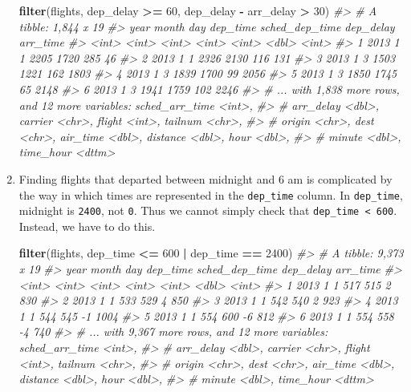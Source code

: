 \documentclass[]{book}
\newenvironment{Shaded}{\begin{snugshade}}{\end{snugshade}}
\newcommand{\CommentTok}[1]{\textcolor[rgb]{0.56,0.35,0.01}{\textit{#1}}}
\newcommand{\DecValTok}[1]{\textcolor[rgb]{0.00,0.00,0.81}{#1}}
\newcommand{\KeywordTok}[1]{\textcolor[rgb]{0.13,0.29,0.53}{\textbf{#1}}}
\newcommand{\NormalTok}[1]{#1}
\newcommand{\OperatorTok}[1]{\textcolor[rgb]{0.81,0.36,0.00}{\textbf{#1}}}
\newcommand{\StringTok}[1]{\textcolor[rgb]{0.31,0.60,0.02}{#1}}
\theoremstyle{plain}
\theoremstyle{remark}
\begin{document}
\begin{enumerate}
\begin{Shaded}
\begin{Highlighting}[]
\KeywordTok{filter}\NormalTok{(flights, dep_delay }\OperatorTok{>=}\StringTok{ }\DecValTok{60}\NormalTok{, dep_delay }\OperatorTok{-}\StringTok{ }\NormalTok{arr_delay }\OperatorTok{>}\StringTok{ }\DecValTok{30}\NormalTok{)}
\CommentTok{#> # A tibble: 1,844 x 19}
\CommentTok{#>    year month   day dep_time sched_dep_time dep_delay arr_time}
\CommentTok{#>   <int> <int> <int>    <int>          <int>     <dbl>    <int>}
\CommentTok{#> 1  2013     1     1     2205           1720       285       46}
\CommentTok{#> 2  2013     1     1     2326           2130       116      131}
\CommentTok{#> 3  2013     1     3     1503           1221       162     1803}
\CommentTok{#> 4  2013     1     3     1839           1700        99     2056}
\CommentTok{#> 5  2013     1     3     1850           1745        65     2148}
\CommentTok{#> 6  2013     1     3     1941           1759       102     2246}
\CommentTok{#> # ... with 1,838 more rows, and 12 more variables: sched_arr_time <int>,}
\CommentTok{#> #   arr_delay <dbl>, carrier <chr>, flight <int>, tailnum <chr>,}
\CommentTok{#> #   origin <chr>, dest <chr>, air_time <dbl>, distance <dbl>, hour <dbl>,}
\CommentTok{#> #   minute <dbl>, time_hour <dttm>}
\end{Highlighting}
\end{Shaded}
\item
  Finding flights that departed between midnight and 6 am is complicated
  by the way in which times are represented in the \texttt{dep\_time}
  column. In \texttt{dep\_time}, midnight is \texttt{2400}, not
  \texttt{0}. Thus we cannot simply check that
  \texttt{dep\_time\ \textless{}\ 600}. Instead, we have to do this.

\begin{Shaded}
\begin{Highlighting}[]
\KeywordTok{filter}\NormalTok{(flights, dep_time }\OperatorTok{<=}\StringTok{ }\DecValTok{600} \OperatorTok{|}\StringTok{ }\NormalTok{dep_time }\OperatorTok{==}\StringTok{ }\DecValTok{2400}\NormalTok{)}
\CommentTok{#> # A tibble: 9,373 x 19}
\CommentTok{#>    year month   day dep_time sched_dep_time dep_delay arr_time}
\CommentTok{#>   <int> <int> <int>    <int>          <int>     <dbl>    <int>}
\CommentTok{#> 1  2013     1     1      517            515         2      830}
\CommentTok{#> 2  2013     1     1      533            529         4      850}
\CommentTok{#> 3  2013     1     1      542            540         2      923}
\CommentTok{#> 4  2013     1     1      544            545        -1     1004}
\CommentTok{#> 5  2013     1     1      554            600        -6      812}
\CommentTok{#> 6  2013     1     1      554            558        -4      740}
\CommentTok{#> # ... with 9,367 more rows, and 12 more variables: sched_arr_time <int>,}
\CommentTok{#> #   arr_delay <dbl>, carrier <chr>, flight <int>, tailnum <chr>,}
\CommentTok{#> #   origin <chr>, dest <chr>, air_time <dbl>, distance <dbl>, hour <dbl>,}
\CommentTok{#> #   minute <dbl>, time_hour <dttm>}
\end{Highlighting}
\end{Shaded}


\end{enumerate}
\end{document}
